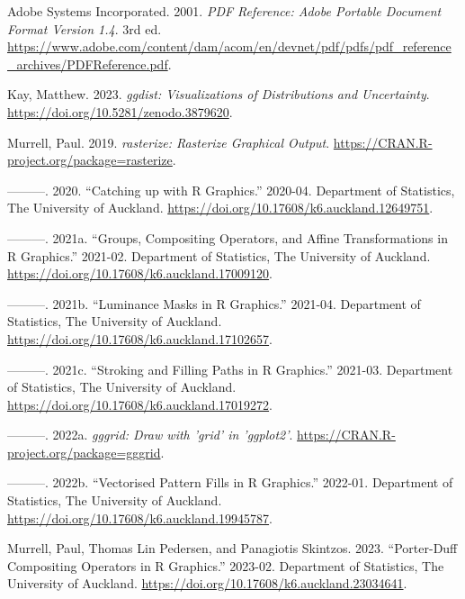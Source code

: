 \hypertarget{refs}{}
\begin{CSLReferences}{1}{0}
\leavevmode{}%
Adobe Systems Incorporated. 2001. \emph{PDF Reference: Adobe Portable Document Format Version 1.4}. 3rd ed. \url{https://www.adobe.com/content/dam/acom/en/devnet/pdf/pdfs/pdf_reference_archives/PDFReference.pdf}.

\leavevmode{}%
Kay, Matthew. 2023. \emph{{ggdist}: Visualizations of Distributions and Uncertainty}. \url{https://doi.org/10.5281/zenodo.3879620}.

\leavevmode{}%
Murrell, Paul. 2019. \emph{{rasterize}: Rasterize Graphical Output}. \url{https://CRAN.R-project.org/package=rasterize}.

\leavevmode{}%
---------. 2020. {``Catching up with {R} Graphics.''} 2020-04. Department of Statistics, The University of Auckland. \url{https://doi.org/10.17608/k6.auckland.12649751}.

\leavevmode{}%
---------. 2021a. {``Groups, Compositing Operators, and Affine Transformations in {R} Graphics.''} 2021-02. Department of Statistics, The University of Auckland. \url{https://doi.org/10.17608/k6.auckland.17009120}.

\leavevmode{}%
---------. 2021b. {``Luminance Masks in {R} Graphics.''} 2021-04. Department of Statistics, The University of Auckland. \url{https://doi.org/10.17608/k6.auckland.17102657}.

\leavevmode{}%
---------. 2021c. {``Stroking and Filling Paths in {R} Graphics.''} 2021-03. Department of Statistics, The University of Auckland. \url{https://doi.org/10.17608/k6.auckland.17019272}.

\leavevmode{}%
---------. 2022a. \emph{{gggrid}: Draw with {'grid'} in {'ggplot2'}}. \url{https://CRAN.R-project.org/package=gggrid}.

\leavevmode{}%
---------. 2022b. {``Vectorised Pattern Fills in {R} Graphics.''} 2022-01. Department of Statistics, The University of Auckland. \url{https://doi.org/10.17608/k6.auckland.19945787}.

\leavevmode{}%
Murrell, Paul, Thomas Lin Pedersen, and Panagiotis Skintzos. 2023. {``Porter-Duff Compositing Operators in {R} Graphics.''} 2023-02. Department of Statistics, The University of Auckland. \url{https://doi.org/10.17608/k6.auckland.23034641}.


\end{CSLReferences}
